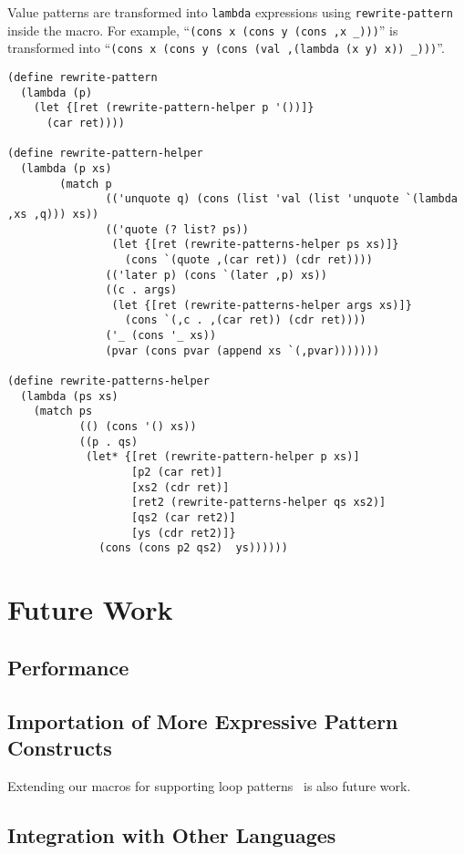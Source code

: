 \documentclass[acmlarge]{acmart}
\begin{document}
Value patterns are transformed into \texttt{lambda} expressions using \texttt{rewrite-pattern} inside the macro.
For example, ``\texttt{(cons x (cons y (cons ,x _)))}'' is transformed into ``\texttt{(cons x (cons y (cons (val ,(lambda (x y) x)) _)))}''.

\begin{lstlisting}[language=egison]
(define rewrite-pattern
  (lambda (p)
    (let {[ret (rewrite-pattern-helper p '())]}
      (car ret))))

(define rewrite-pattern-helper
  (lambda (p xs)
        (match p
               (('unquote q) (cons (list 'val (list 'unquote `(lambda ,xs ,q))) xs))
               (('quote (? list? ps))
                (let {[ret (rewrite-patterns-helper ps xs)]}
                  (cons `(quote ,(car ret)) (cdr ret))))
               (('later p) (cons `(later ,p) xs))
               ((c . args)
                (let {[ret (rewrite-patterns-helper args xs)]}
                  (cons `(,c . ,(car ret)) (cdr ret))))
               ('_ (cons '_ xs))
               (pvar (cons pvar (append xs `(,pvar)))))))

(define rewrite-patterns-helper
  (lambda (ps xs)
    (match ps
           (() (cons '() xs))
           ((p . qs)
            (let* {[ret (rewrite-pattern-helper p xs)]
                   [p2 (car ret)]
                   [xs2 (cdr ret)]
                   [ret2 (rewrite-patterns-helper qs xs2)]
                   [qs2 (car ret2)]
                   [ys (cdr ret2)]}
              (cons (cons p2 qs2)  ys))))))
\end{lstlisting}


\section{Future Work}\label{future}

\subsection{Performance}

\subsection{Importation of More Expressive Pattern Constructs}

Extending our macros for supporting loop patterns~\cite{egi2018loop} is also future work.

\subsection{Integration with Other Languages}
\end{document}
